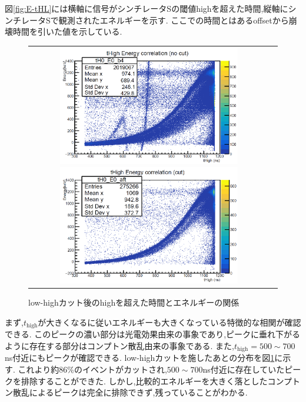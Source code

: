 図\ref{fig:E-tHL}には横軸に信号がシンチレータSの閾値highを超えた時間,縦軸にシンチレータSで観測されたエネルギーを示す.
ここでの時間とはあるoffsetから崩壊時間を引いた値を示している.
\begin{figure}[H]
	\begin{tabular}{cc}
		\begin{minipage}{0.5\hsize}
			\centering
				\includegraphics[width=80mm]{fig/isb/E-tHL.pdf}
				\caption{low-highカット前の閾値highを超えた時間とエネルギーの関係}
				\label{fig:E-tHL}
		\end{minipage}
		\begin{minipage}{0.5\hsize}
			\centering
				\includegraphics[width=80mm]{fig/isb/E-tHL_cut.pdf}
				\caption{low-highカット後のhighを超えた時間とエネルギーの関係}
				\label{fig:E-tHL_cut}
		\end{minipage}
	\end{tabular}
\end{figure}
まず,$t_\textrm{high}$が大きくなるに従いエネルギーも大きくなっている特徴的な相関が確認できる.
このピークの濃い部分は光電効果由来の事象であり,ピークに垂れ下がるように存在する部分はコンプトン散乱由来の事象である.
また,$t_\textrm{high}=500\sim700$ns付近にもピークが確認できる.
low-highカットを施したあとの分布を図\ref{fig:E-tHL_cut}に示す.
これより約86\%のイベントがカットされ,$500\sim700$ns付近に存在していたピークを排除することができた.
しかし,比較的エネルギーを大きく落としたコンプトン散乱によるピークは完全に排除できず,残っていることがわかる.

